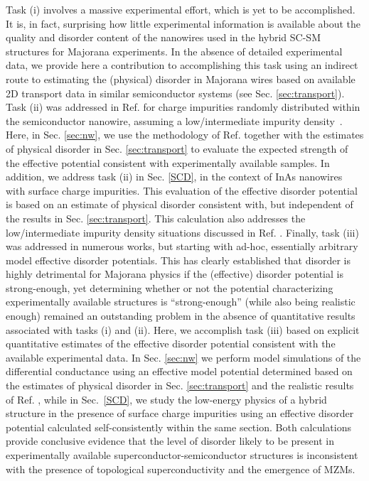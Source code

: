 \documentclass[aps,prmaterials,twocolumn,superscriptaddress,longbibliography]{revtex4-2}
\begin{document}
Task (i) involves a massive experimental effort, which is yet to be accomplished. It is, in fact, surprising how little experimental information is available about the quality and disorder content of the nanowires used in the hybrid SC-SM structures for Majorana experiments. In the absence of detailed experimental data, we provide here a contribution to accomplishing this task using an indirect route to estimating the (physical) disorder in Majorana wires based on available 2D transport data in similar semiconductor systems (see Sec. \ref{sec:transport}). Task (ii) was addressed in Ref.  for charge impurities randomly distributed within the semiconductor nanowire, assuming a low/intermediate impurity density~\cite{woods2021charge}. Here, in Sec. \ref{sec:nw}, we use the methodology of Ref.  together with the estimates of physical disorder in Sec. \ref{sec:transport} to evaluate the expected strength of the effective potential consistent with experimentally available samples. In addition, we address task (ii) in Sec. \ref{SCD}, in the context of InAs nanowires with surface charge impurities. This evaluation of the effective disorder potential is based on an estimate of physical disorder consistent with, but independent of the results in Sec. \ref{sec:transport}. This calculation also addresses the low/intermediate impurity density situations discussed in Ref. . Finally, task (iii) was addressed in numerous works, but starting with ad-hoc, essentially arbitrary model effective disorder potentials. This has clearly established that disorder is highly detrimental for Majorana physics if the (effective) disorder potential is strong-enough, yet determining whether or not the potential characterizing experimentally available structures is ``strong-enough'' (while also being realistic enough) remained an outstanding problem in the absence of quantitative results associated with tasks (i) and (ii). Here, we accomplish task (iii) based on explicit quantitative estimates of the effective disorder potential consistent with the available experimental data. In Sec.  \ref{sec:nw} we perform model simulations of the differential conductance using an effective model potential determined based on the estimates of physical disorder in Sec. \ref{sec:transport} and the realistic results of Ref. , while in Sec.~\ref{SCD}, we study the low-energy physics of a hybrid structure in the presence of surface charge impurities using an effective disorder potential calculated self-consistently within the same section. Both calculations provide conclusive evidence that the level of disorder likely to be present in experimentally available superconductor-semiconductor structures is inconsistent with the presence of topological superconductivity and the emergence of MZMs. 
\end{document}
